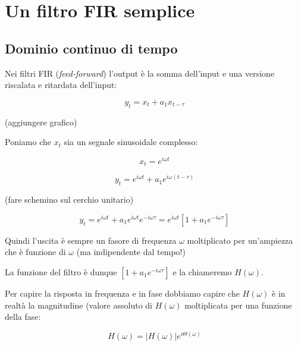 %
%

\section{Un filtro FIR semplice\label{sec:simple fir}}

\subsection{Dominio continuo di tempo\label{sec:continuous time}}

Nei filtri FIR (\emph{feed-forward}) l'output \`e la somma dell'input e una versione riscalata e ritardata
    dell'input:

    \begin{equation}\label{eqn:fir semplice}
            y_t = x_t + a_1 x_{t-\tau}
      \end{equation}

    (aggiungere grafico)

  Poniamo che $x_t$ sia un segnale sinusoidale complesso:

     \begin{equation}
      x_t = e^{i\omega t}\nonumber
     \end{equation}

     \begin{equation}
      y_t = e^{i \omega t} + a_1 e^{i \omega (t - \tau)}
     \end{equation}

    (fare schemino sul cerchio unitario)

     \begin{equation}
      y_t = e^{i \omega t} + a_1 e^{i \omega t} e^{-i \omega \tau} = e^{i\omega t} \left [ 1 + a_1 e^{-i \omega \tau} \right ]
     \end{equation}

  Quindi l'uscita \`e sempre un fasore di frequenza $\omega$ moltiplicato per
    un'ampiezza che \`e funzione di $\omega$ (ma indipendente dal tempo!)

  La funzione del filtro \`e dunque $\left [ 1 + a_1 e^{-i \omega \tau} \right ]$ e la chiameremo $H(\omega)$.

  Per capire la risposta in frequenza e in fase dobbiamo capire che $H(\omega)$ \`e
    in realt\`a la magnitudine (valore assoluto di $H(\omega)$ moltiplicata per una
    funzione della fase:

     \begin{equation}
      H(\omega) = |H(\omega)| e^{i \Theta(\omega)}
     \end{equation}

